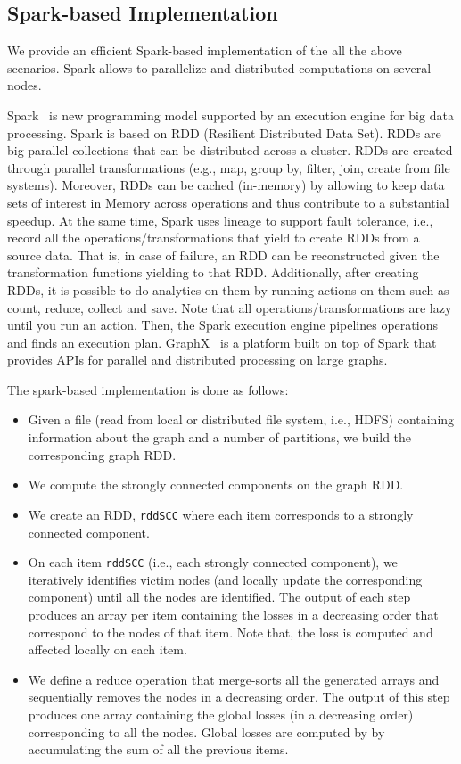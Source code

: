 \subsection{Spark-based Implementation}
We provide an efficient Spark-based implementation of the all the above scenarios. Spark allows to parallelize and distributed computations on several nodes. 


Spark~\cite{spark} is new programming model supported by an execution engine for big data processing. Spark is based on RDD (Resilient Distributed Data Set). RDDs are big parallel collections that can be distributed across a cluster. RDDs are created through parallel transformations (e.g., map, group by, filter, join, create from file systems). Moreover, RDDs can be cached (in-memory) by allowing to keep data sets of interest in Memory across operations and thus contribute to a substantial speedup. At the same time, Spark uses lineage to support fault tolerance, i.e., record all the operations/transformations that yield to create RDDs from a source data. That is, in case of failure, an RDD can be reconstructed given the transformation functions yielding to that RDD. Additionally, after creating RDDs, it is possible to do analytics on them by running actions on them such as count, reduce, collect and save. Note that all operations/transformations are lazy until you run an action. Then, the Spark execution engine pipelines operations and finds an execution plan. GraphX~\cite{graphx} is a platform built on top of Spark that provides APIs for parallel and distributed processing on large graphs. 


The spark-based implementation is done as follows:
\begin{itemize}
\item Given a file (read from local or distributed file system, i.e., HDFS) containing information about the graph and a number of partitions, we build the corresponding graph RDD. 
\item We compute the strongly connected components on the graph RDD. 
\item We create an RDD, \texttt{rddSCC} where each item corresponds to a strongly connected component. 
\item On each item \texttt{rddSCC} (i.e., each strongly connected component), we iteratively identifies victim nodes (and locally update the corresponding component) until all the nodes are identified. The output of each step produces an array per item containing the losses in a decreasing order that correspond to the nodes of that item. Note that, the loss is computed and affected locally on each item. 
\item We define a reduce operation that merge-sorts all the generated arrays and sequentially removes the nodes in a decreasing order. The output of this step produces one array containing the global losses (in a decreasing order) corresponding to all the nodes. Global losses are computed by by accumulating the sum of all the previous items. 
\end{itemize}




